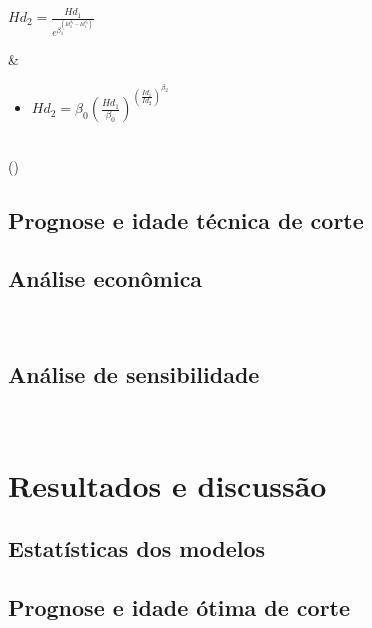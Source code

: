 \documentclass[
  letterpaper,
  DIV=11,
  numbers=noendperiod]{scrartcl}
\providecommand{\tightlist}{%
  \setlength{\itemsep}{0pt}\setlength{\parskip}{0pt}}\usepackage{longtable,booktabs,array}
\begin{document}
\begin{longtable}[]
\begin{minipage}[t]{\linewidth}
\begin{itemize}
  \(Hd_ 2 = \frac{ Hd_1 } { e^{ \beta_1^{ ( Id_ 2 ^{\beta_2 } - Id_1 ^{ \beta_2}) } } }\)
\end{itemize}
\end{minipage} & \begin{minipage}[t]{\linewidth}\raggedright
\begin{itemize}
\tightlist
\item
  \(H d_2 = \beta_0 \left( \frac{ Hd_1 } { \beta_0 } \right )^ { \left( \frac{ Id_1 } { Id_ 2 } \right ) ^{ \beta_2 } }\)
\end{itemize}
\end{minipage} \\
\bottomrule()
\end{longtable}

\hypertarget{prognose-e-idade-tuxe9cnica-de-corte}{%
\subsection{Prognose e idade técnica de
corte}\label{prognose-e-idade-tuxe9cnica-de-corte}}

\hypertarget{anuxe1lise-econuxf4mica}{%
\subsection{Análise econômica}\label{anuxe1lise-econuxf4mica}}

~

\hypertarget{anuxe1lise-de-sensibilidade}{%
\subsection{Análise de
sensibilidade}\label{anuxe1lise-de-sensibilidade}}

~

\hypertarget{resultados-e-discussuxe3o}{%
\section{Resultados e discussão}\label{resultados-e-discussuxe3o}}

\hypertarget{estatuxedsticas-dos-modelos}{%
\subsection{Estatísticas dos
modelos}\label{estatuxedsticas-dos-modelos}}

\hypertarget{prognose-e-idade-uxf3tima-de-corte}{%
\subsection{Prognose e idade ótima de
corte}\label{prognose-e-idade-uxf3tima-de-corte}}
\end{document}
